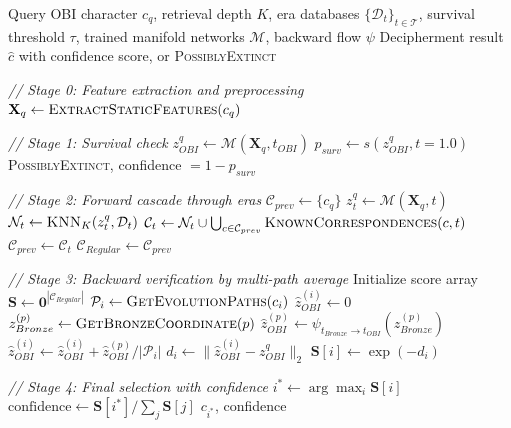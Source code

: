 \documentclass{article}
\begin{document}
\begin{algorithm}[h]
\caption{Cascaded Bidirectional Decipherment}
\label{alg:decipher}
\begin{algorithmic}[1]
\REQUIRE Query OBI character $c_q$, retrieval depth $K$, era databases $\{\mathcal{D}_t\}_{t\in\mathcal{T}}$, survival threshold $\tau$, trained manifold networks $\mathcal{M}$, backward flow $\psi$
\ENSURE Decipherment result $\hat{c}$ with confidence score, or \textsc{PossiblyExtinct}

\STATE \textit{// Stage 0: Feature extraction and preprocessing}
\STATE $\mathbf{X}_q \leftarrow \textsc{ExtractStaticFeatures}(c_q)$

\STATE \textit{// Stage 1: Survival check}
\STATE $z^q_{OBI} \leftarrow \mathcal{M}(\mathbf{X}_q, t_{OBI})$
\STATE $p_{surv} \leftarrow s(z^q_{OBI}, t=1.0)$
    \RETURN \textsc{PossiblyExtinct}, confidence $=1-p_{surv}$
\ENDIF

\STATE \textit{// Stage 2: Forward cascade through eras}
\STATE $\mathcal{C}_{prev} \leftarrow \{c_q\}$
    \STATE $z^q_t \leftarrow \mathcal{M}(\mathbf{X}_q, t)$
    \STATE $\mathcal{N}_t \leftarrow \textsc{KNN}_K(z^q_t, \mathcal{D}_t)$
    \STATE $\mathcal{C}_t \leftarrow \mathcal{N}_t \cup \bigcup_{c\in \mathcal{C}_{prev}}\textsc{KnownCorrespondences}(c,t)$
    \STATE $\mathcal{C}_{prev} \leftarrow \mathcal{C}_t$
\ENDFOR
\STATE $\mathcal{C}_{Regular} \leftarrow \mathcal{C}_{prev}$

\STATE \textit{// Stage 3: Backward verification by multi-path average}
\STATE Initialize score array $\mathbf{S} \leftarrow \mathbf{0}^{|\mathcal{C}_{Regular}|}$
    \STATE $\mathcal{P}_i \leftarrow \textsc{GetEvolutionPaths}(c_i)$
    \STATE $\hat{z}^{(i)}_{OBI} \leftarrow 0$
        \STATE $z^{(p)}_{Bronze} \leftarrow \textsc{GetBronzeCoordinate}(p)$
        \STATE $\hat{z}^{(p)}_{OBI} \leftarrow \psi_{t_{Bronze}\to t_{OBI}}(z^{(p)}_{Bronze})$
        \STATE $\hat{z}^{(i)}_{OBI} \leftarrow \hat{z}^{(i)}_{OBI} + \hat{z}^{(p)}_{OBI}/|\mathcal{P}_i|$
    \ENDFOR
    \STATE $d_i \leftarrow \|\hat{z}^{(i)}_{OBI} - z^q_{OBI}\|_2$
    \STATE $\mathbf{S}[i] \leftarrow \exp(-d_i)$
\ENDFOR

\STATE \textit{// Stage 4: Final selection with confidence}
\STATE $i^* \leftarrow \arg\max_i \mathbf{S}[i]$
\STATE $\text{confidence} \leftarrow \mathbf{S}[i^*] / \sum_j \mathbf{S}[j]$
\RETURN $c_{i^*}$, confidence
\end{algorithmic}
\end{algorithm}
\end{document}
